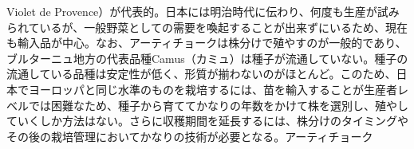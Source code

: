 \begin{Main}
{{{{  Violet de
  Provence）が代表的。日本には明治時代に伝わり、何度も生産が試みられているが、一般野菜としての需要を喚起することが出来ずにいるため、現在も輸入品が中心。なお、アーティチョークは株分けで殖やすのが一般的であり、ブルターニュ地方の代表品種Camus（カミュ）は種子が流通していない。種子の流通している品種は安定性が低く、形質が揃わないのがほとんど。このため、日本でヨーロッパと同じ水準のものを栽培するには、苗を輸入することが生産者レベルでは困難なため、種子から育ててかなりの年数をかけて株を選別し、殖やしていくしか方法はない。さらに収穫期間を延長するには、株分けのタイミングやその後の栽培管理においてかなりの技術が必要となる。}}{アーティチョーク}}\label{artichauts}}



\end{Main}

